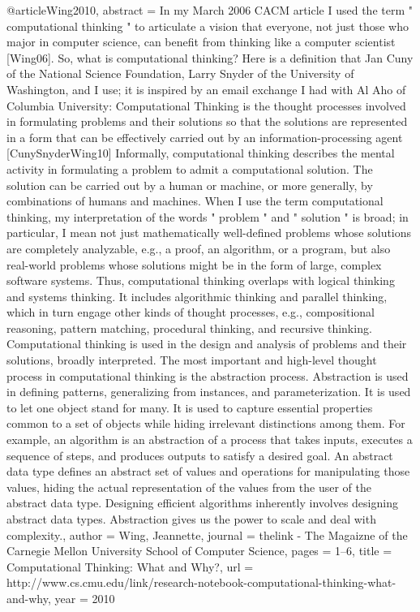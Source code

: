 @article{Wing2010,
	abstract = {In my March 2006 CACM article I used the term " computational thinking " to articulate a vision that everyone, not just those who major in computer science, can benefit from thinking like a computer scientist [Wing06]. So, what is computational thinking? Here is a definition that Jan Cuny of the National Science Foundation, Larry Snyder of the University of Washington, and I use; it is inspired by an email exchange I had with Al Aho of Columbia University: Computational Thinking is the thought processes involved in formulating problems and their solutions so that the solutions are represented in a form that can be effectively carried out by an information-processing agent [CunySnyderWing10] Informally, computational thinking describes the mental activity in formulating a problem to admit a computational solution. The solution can be carried out by a human or machine, or more generally, by combinations of humans and machines. When I use the term computational thinking, my interpretation of the words " problem " and " solution " is broad; in particular, I mean not just mathematically well-defined problems whose solutions are completely analyzable, e.g., a proof, an algorithm, or a program, but also real-world problems whose solutions might be in the form of large, complex software systems. Thus, computational thinking overlaps with logical thinking and systems thinking. It includes algorithmic thinking and parallel thinking, which in turn engage other kinds of thought processes, e.g., compositional reasoning, pattern matching, procedural thinking, and recursive thinking. Computational thinking is used in the design and analysis of problems and their solutions, broadly interpreted. The most important and high-level thought process in computational thinking is the abstraction process. Abstraction is used in defining patterns, generalizing from instances, and parameterization. It is used to let one object stand for many. It is used to capture essential properties common to a set of objects while hiding irrelevant distinctions among them. For example, an algorithm is an abstraction of a process that takes inputs, executes a sequence of steps, and produces outputs to satisfy a desired goal. An abstract data type defines an abstract set of values and operations for manipulating those values, hiding the actual representation of the values from the user of the abstract data type. Designing efficient algorithms inherently involves designing abstract data types. Abstraction gives us the power to scale and deal with complexity.},
	author = {Wing, Jeannette},
	journal = {thelink - The Magaizne of the Carnegie Mellon University School of Computer Science},
	pages = {1--6},
	title = {{Computational Thinking: What and Why?}},
	url = {http://www.cs.cmu.edu/link/research-notebook-computational-thinking-what-and-why},
	year = {2010}
}

